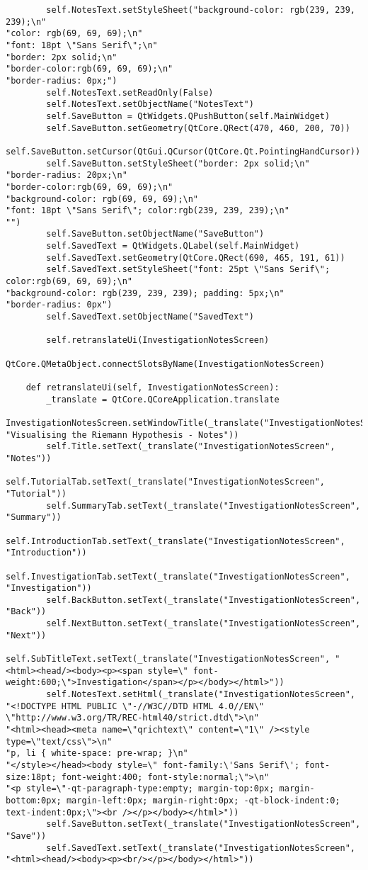 \documentclass{article}
\begin{document}
\begin{lstlisting}
        self.NotesText.setStyleSheet("background-color: rgb(239, 239, 239);\n"
"color: rgb(69, 69, 69);\n"
"font: 18pt \"Sans Serif\";\n"
"border: 2px solid;\n"
"border-color:rgb(69, 69, 69);\n"
"border-radius: 0px;")
        self.NotesText.setReadOnly(False)
        self.NotesText.setObjectName("NotesText")
        self.SaveButton = QtWidgets.QPushButton(self.MainWidget)
        self.SaveButton.setGeometry(QtCore.QRect(470, 460, 200, 70))
        self.SaveButton.setCursor(QtGui.QCursor(QtCore.Qt.PointingHandCursor))
        self.SaveButton.setStyleSheet("border: 2px solid;\n"
"border-radius: 20px;\n"
"border-color:rgb(69, 69, 69);\n"
"background-color: rgb(69, 69, 69);\n"
"font: 18pt \"Sans Serif\"; color:rgb(239, 239, 239);\n"
"")
        self.SaveButton.setObjectName("SaveButton")
        self.SavedText = QtWidgets.QLabel(self.MainWidget)
        self.SavedText.setGeometry(QtCore.QRect(690, 465, 191, 61))
        self.SavedText.setStyleSheet("font: 25pt \"Sans Serif\"; color:rgb(69, 69, 69);\n"
"background-color: rgb(239, 239, 239); padding: 5px;\n"
"border-radius: 0px")
        self.SavedText.setObjectName("SavedText")

        self.retranslateUi(InvestigationNotesScreen)
        QtCore.QMetaObject.connectSlotsByName(InvestigationNotesScreen)

    def retranslateUi(self, InvestigationNotesScreen):
        _translate = QtCore.QCoreApplication.translate
        InvestigationNotesScreen.setWindowTitle(_translate("InvestigationNotesScreen", "Visualising the Riemann Hypothesis - Notes"))
        self.Title.setText(_translate("InvestigationNotesScreen", "Notes"))
        self.TutorialTab.setText(_translate("InvestigationNotesScreen", "Tutorial"))
        self.SummaryTab.setText(_translate("InvestigationNotesScreen", "Summary"))
        self.IntroductionTab.setText(_translate("InvestigationNotesScreen", "Introduction"))
        self.InvestigationTab.setText(_translate("InvestigationNotesScreen", "Investigation"))
        self.BackButton.setText(_translate("InvestigationNotesScreen", "Back"))
        self.NextButton.setText(_translate("InvestigationNotesScreen", "Next"))
        self.SubTitleText.setText(_translate("InvestigationNotesScreen", "<html><head/><body><p><span style=\" font-weight:600;\">Investigation</span></p></body></html>"))
        self.NotesText.setHtml(_translate("InvestigationNotesScreen", "<!DOCTYPE HTML PUBLIC \"-//W3C//DTD HTML 4.0//EN\" \"http://www.w3.org/TR/REC-html40/strict.dtd\">\n"
"<html><head><meta name=\"qrichtext\" content=\"1\" /><style type=\"text/css\">\n"
"p, li { white-space: pre-wrap; }\n"
"</style></head><body style=\" font-family:\'Sans Serif\'; font-size:18pt; font-weight:400; font-style:normal;\">\n"
"<p style=\"-qt-paragraph-type:empty; margin-top:0px; margin-bottom:0px; margin-left:0px; margin-right:0px; -qt-block-indent:0; text-indent:0px;\"><br /></p></body></html>"))
        self.SaveButton.setText(_translate("InvestigationNotesScreen", "Save"))
        self.SavedText.setText(_translate("InvestigationNotesScreen", "<html><head/><body><p><br/></p></body></html>"))
\end{lstlisting}
\end{document}
